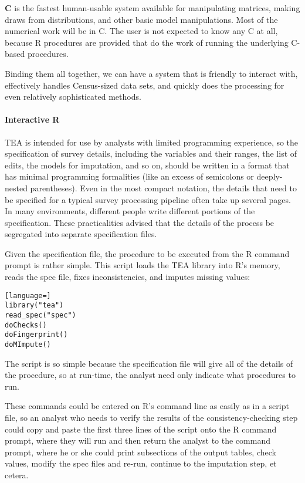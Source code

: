 \documentclass{article}
\begin{document}
{\bf C} is the fastest human-usable system available for manipulating matrices, making
draws from distributions, and other basic model manipulations. Most of the numerical
work will be in C. The user is not expected to know any C at all, because R procedures
are provided that do the work of running the underlying C-based procedures.

Binding them all together, we can have a system that is friendly to interact with,
effectively handles Census-sized data sets, and quickly does the processing for
even relatively sophisticated methods.

\paragraph{Interactive R}
TEA is intended for use by analysts with limited programming experience, so the
specification of survey details,
including the variables and their ranges, the list of edits, the models for imputation,
and so on, should be written in a format that has minimal programming
formalities (like an excess of semicolons or deeply-nested parentheses).
Even in the most compact notation, the details that need to be specified for a typical survey
processing pipeline often take up several pages. In many environments, different people
write different portions of the specification. These practicalities advised that the
details of the process be segregated into separate specification files.

Given the specification file, the procedure to be executed from the R command prompt is
rather simple. This script loads the
TEA library into R's memory, reads the spec file, fixes inconsistencies, and imputes
missing values:

\begin{lstlisting}[language=]
library("tea")
read_spec("spec")
doChecks()
doFingerprint()
doMImpute()
\end{lstlisting}

The script is so simple because the specification file will give all of the details
of the procedure, so at run-time, the analyst need only indicate what procedures to run.

These commands could be entered on R's command line as easily as in a script file, so an
analyst who needs to verify the results of the consistency-checking step could copy and
paste the first three lines of the script onto the R command prompt, where they will run and
then return the analyst to the command prompt, where he or she could print subsections of
the output tables, check values, modify the spec files and re-run, continue to the
imputation step, et cetera.
\end{document}
